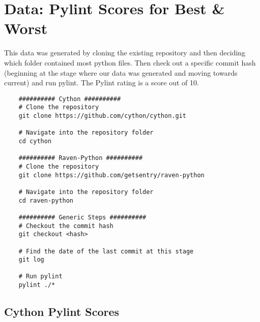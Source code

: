 \section{Data: Pylint Scores for Best \& Worst} \label{appendixPylintScores}

\begin{singlespace}
  This data was generated by cloning the existing repository and then deciding which folder contained most python files. Then check out a specific commit hash (beginning at the stage where our data was generated and moving towards current) and run pylint. The Pylint rating is a score out of 10.
\end{singlespace}

\begin{singlespace}
  \small
  \begin{verbatim}
    ########## Cython ##########
    # Clone the repository
    git clone https://github.com/cython/cython.git

    # Navigate into the repository folder
    cd cython

    ########## Raven-Python ##########
    # Clone the repository
    git clone https://github.com/getsentry/raven-python

    # Navigate into the repository folder
    cd raven-python

    ########## Generic Steps ##########
    # Checkout the commit hash
    git checkout <hash>

    # Find the date of the last commit at this stage
    git log

    # Run pylint
    pylint ./*
  \end{verbatim}
\end{singlespace}

\newpage
\subsection{Cython Pylint Scores} \label{appendixPylintCython}

